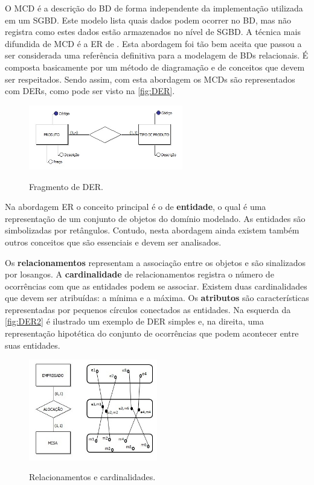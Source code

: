O \ac{MCD} é a descrição do \ac{BD} de forma independente da implementação utilizada em um \ac{SGBD}. 
Este modelo lista quais dados podem ocorrer no \ac{BD}, mas não registra como estes dados estão armazenados no nível de \ac{SGBD}. 
A técnica mais difundida de \ac{MCD} é a \ac{ER} de . 
Esta abordagem foi tão bem aceita que passou a ser considerada uma referência definitiva para a modelagem de \acp{BD} relacionais. 
É composta basicamente por um método de diagramação e de conceitos que devem ser respeitados. 
Sendo assim, com esta abordagem os \acp{MCD} são representados com \acp{DER}, como pode ser visto na \autoref{fig:DER}.
    
\begin{figure}[htb]
	\centering
	\caption{Fragmento de DER.}
		\includegraphics[width=0.6\textwidth]{img/MCD.jpg}
	\label{fig:DER}
\end{figure}

Na abordagem \ac{ER} o conceito principal é o de \textbf{entidade}, o qual é uma representação de um conjunto de objetos do domínio modelado. 
As entidades são simbolizadas por retângulos. 
Contudo, nesta abordagem ainda existem também outros conceitos que são essenciais e devem ser analisados.

Os \textbf{relacionamentos} representam a associação entre os objetos e são sinalizados por losangos. 
A \textbf{cardinalidade} de relacionamentos registra o número de ocorrências com que as entidades podem se associar. 
Existem duas cardinalidades que devem ser atribuídas: a mínima e a máxima. Os \textbf{atributos} são características representadas por pequenos círculos conectados as entidades. 
Na esquerda da \autoref{fig:DER2} é ilustrado um exemplo de \ac{DER} simples e, na direita, uma representação hipotética do conjunto de ocorrências que podem acontecer entre suas entidades. 

\begin{figure}[htb]
	\centering
	\caption{Relacionamentos e cardinalidades.}
		\includegraphics[width=0.5\textwidth]{img/RelCard.jpg}
	\label{fig:DER2}
\end{figure}

